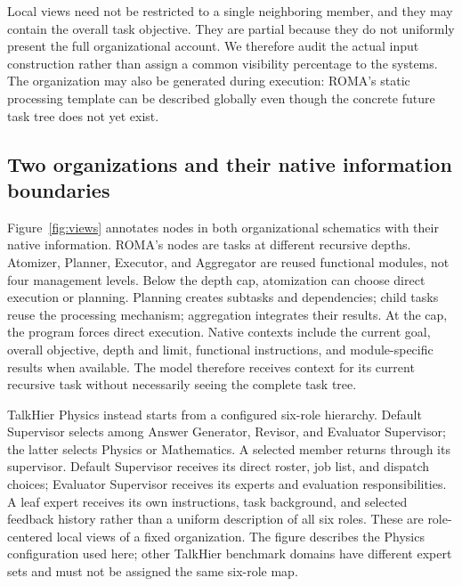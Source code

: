 \documentclass[10pt,letterpaper,twocolumn]{article}
\begin{document}
Local views need not be restricted to a single neighboring member, and they may contain the overall task objective. They are partial because they do not uniformly present the full or\-ga\-ni\-za\-tion\-al account. We therefore audit the actual input construction rather than assign a common vis\-i\-bil\-i\-ty percentage to the sys\-tems. The or\-ga\-ni\-za\-tion may also be generated during ex\-e\-cu\-tion: ROMA's stat\-ic processing template can be described globally even though the concrete future task tree does not yet exist.

\subsection{Two or\-ga\-ni\-za\-tions and their na\-tive in\-for\-ma\-tion boundaries}
Figure~\ref{fig:views} annotates nodes in both or\-ga\-ni\-za\-tion\-al schematics with their na\-tive in\-for\-ma\-tion. ROMA's nodes are tasks at dif\-fer\-ent re\-cur\-sive depths. Atomizer, Planner, Executor, and Aggregator are reused functional modules, not four management levels. Below the depth cap, atomization can choose direct ex\-e\-cu\-tion or planning. Planning creates subtasks and dependencies; child tasks reuse the processing mech\-a\-nism; aggregation integrates their results. At the cap, the program forces direct ex\-e\-cu\-tion. Native con\-texts include the current goal, overall objective, depth and limit, functional instructions, and module-specific results when available. The mod\-el therefore receives con\-text for its current re\-cur\-sive task without necessarily seeing the complete task tree.

TalkHier Phys\-ics instead starts from a configured six-role hi\-er\-ar\-chy. Default Supervisor selects among Answer Generator, Revisor, and Evaluator Supervisor; the latter selects Phys\-ics or Mathematics. A selected member returns through its supervisor. Default Supervisor receives its direct roster, job list, and dispatch choices; Evaluator Supervisor receives its experts and evaluation responsibilities. A leaf expert receives its own instructions, task background, and selected feedback history rather than a uniform de\-scrip\-tion of all six roles. These are role-centered local views of a fixed or\-ga\-ni\-za\-tion. The figure describes the Phys\-ics configuration used here; other TalkHier benchmark domains have dif\-fer\-ent expert sets and must not be assigned the same six-role map.
\end{document}
